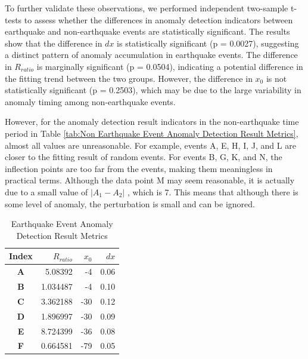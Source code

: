 \documentclass[3p,authoryear,preprint,12pt]{elsarticle}
\begin{document}
{To further validate these observations, we performed independent two-sample t-tests to assess whether the differences in anomaly detection indicators between earthquake and non-earthquake events are statistically significant. The results show that the difference in $dx$ is statistically significant (p = 0.0027), suggesting a distinct pattern of anomaly accumulation in earthquake events. The difference in $R_{ratio}$ is marginally significant (p = 0.0504), indicating a potential difference in the fitting trend between the two groups. However, the difference in $x_0$ is not statistically significant (p = 0.2503), which may be due to the large variability in anomaly timing among non-earthquake events.}

{However, for the anomaly detection result indicators} in the non-earthquake time period in Table \ref{tab:Non Earthquake Event Anomaly Detection Result Metrics}, almost all values are unreasonable. For example, events A, E, H, I, J, and L are closer to the fitting result of random events. For events B, G, K, and N, the inflection points are too far from the events, making them meaningless in practical terms. Although the data point M may seem reasonable, it is actually due to a small value of $\vert A_1 - A_2 \vert$ , which is 7. This means that although there is some level of anomaly, the perturbation is small and can be ignored.
\begin{table}[htbp]
	\caption{Earthquake Event Anomaly Detection Result Metrics}
	\label{tab:Earthquake Event Anomaly Detection Result Metrics}
	\centering
	\begin{tabular}{crrr}
		\toprule
		\textbf{Index}& $R_{ratio}$ & $x_0$       & $dx$    \\
		\midrule
		\textbf{A} & 5.08392     & -4     & 0.06 \\
		\textbf{B} & 1.034487    & -4     & 0.10 \\
		\textbf{C} & 3.362188    & -30    & 0.12 \\
		\textbf{D} & 1.896997    & -30    & 0.09 \\
		\textbf{E} & 8.724399    & -36    & 0.08 \\
		\textbf{F} & 0.664581    & -79    & 0.05 \\
		\bottomrule
	\end{tabular}
\end{table}
\end{document}
